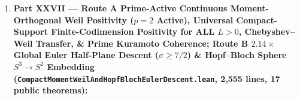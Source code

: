 \documentclass[
  11pt,
]{article}
\providecommand{\tightlist}{%
  \setlength{\itemsep}{0pt}\setlength{\parskip}{0pt}}
\begin{document}
\begin{enumerate}
  \begin{itemize}
  \tightlist
  \item
    \texttt{geodesicPullback\_L2\_isometry},
    \texttt{stereographic\_pullback\_L2\_isometry},
    \texttt{quadraticForm\_bijective\_pullback\_invariance},
    \texttt{oddSinMode\_iteratedDeriv\_L2\_norm\_sq},
    \texttt{weilTruncated\_with\_jerk\_eventually\_neg},
    \texttt{chebyshevPsi\_step\_stieltjes\_ibp},
    \texttt{weilPole\_sub\_weilPrime\_exact\_chebyshev\_renormalization},
    \& \texttt{oddSinMode\_autocorr\_exact\_and\_renormalized}.
  \item
    \texttt{jacobiPsi\_modular\_conservation\_order\_one\_and\_three},
    \texttt{complex\_digamma\_re\_ge\_real\_add\_finset},
    \texttt{complex\_digamma\_real\_mono},
    \texttt{vonMangoldt\_lseries\_norm\_le\_tsum},
    \texttt{vonMangoldt\_lseries\_norm\_le\_of\_eight\_le},
    \texttt{xiResolvent\_herglotz\_global\_euler\_halfPlane}, \&
    \texttt{xiResolvent\_herglotz\_euler\_large\_gamma\_all\_gt\_half}.
  \item
    \texttt{jacobiClipMatrix\_congruence\_hermitian\_psd},
    \texttt{jacobiClip\_hermitian\_psd\_and\_pos\_of\_inf\_norm},
    \texttt{dampedJacobi\_universalSolver\_psd\_and\_equivalence}, \&
    \texttt{pickMatrix\_xiResolvent\_jacobiClip\_pos\_of\_diagDom}.
  \end{itemize}
\item
  \textbf{Part XXVII --- Route A Prime-Active Continuous
  Moment-Orthogonal Weil Positivity (\(p = 2\) Active), Universal
  Compact-Support Finite-Codimension Positivity for ALL \(L > 0\),
  Chebyshev--Weil Transfer, \& Prime Kuramoto Coherence; Route B
  \(2.14\times\) Global Euler Half-Plane Descent (\(\sigma \ge 7/2\)) \&
  Hopf--Bloch Sphere \(S^3 \to S^2\) Embedding
  (\texttt{CompactMomentWeilAndHopfBlochEulerDescent.lean}, 2,555 lines,
  17 public theorems):}


\end{enumerate}
\end{document}

